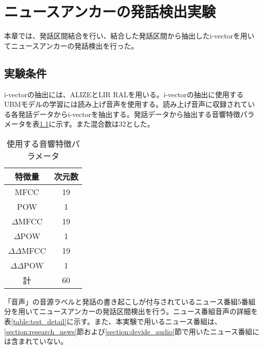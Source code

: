 \chapter{ニュースアンカーの発話検出実験}
\label{chapter:get_anchor}
本章では、発話区間結合を行い、結合した発話区間から抽出したi-vectorを用いてニュースアンカーの発話検出を行った。

\section{実験条件}
i-vectorの抽出には、ALIZEとLIR RAL\cite{alize}を用いる。i-vectorの抽出に使用するUBMモデルの学習には読み上げ音声\cite{ATR}を使用する。読み上げ音声に収録されている各発話データからi-vectorを抽出する。発話データから抽出する音響特徴パラメータを表\ref{iv_feature2}に示す。また混合数は32とした。\par

\begin{table}[H]
  \begin{center}
    \caption{使用する音響特徴パラメータ \label{iv_feature2}}
    \begin{tabular}{|c||c|} \hline
      特徴量 & 次元数\\ \hline
      MFCC & 19  \\ 
      POW & 1  \\ 
      $\Delta$MFCC & 19 \\ 
      $\Delta$POW & 1 \\ 
      $\Delta\Delta$MFCC & 19 \\ 
      $\Delta\Delta$POW & 1 \\ \hline
      計 & 60 \\ \hline
    \end{tabular}
  \end{center}
\end{table}

\vspace{0.2in}\par
「音声」の音源ラベルと発話の書き起こしが付与されているニュース番組5番組分を用いてニュースアンカーの発話区間検出を行う。ニュース番組音声の詳細を表\ref{table:test_detail}に示す。また、本実験で用いるニュース番組は、\ref{section:research_news}節および\ref{section:devide_audio}節で用いたニュース番組には含まれていない。

